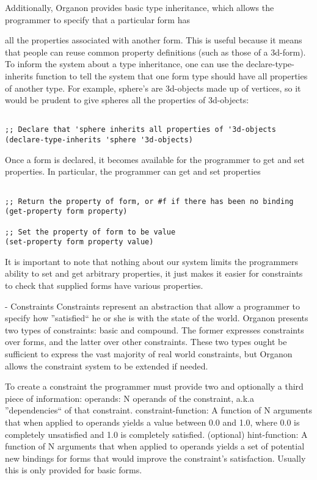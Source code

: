 \documentclass[12pt,a4paper]{article}
\begin{document}
Additionally, Organon provides basic type inheritance, which allows the programmer to specify that a particular form has 

all the properties associated with another form.   This is useful because it means that people can reuse common property definitions (such as those of a 3d-form).  To inform the system about a type inheritance, one can use the declare-type-inherits function to tell the system that one form type should have all properties of another type.  For example, sphere's are 3d-objects made up of vertices, so it would be prudent to give spheres all the properties of 3d-objects:
\begin{lstlisting}

;; Declare that 'sphere inherits all properties of '3d-objects
(declare-type-inherits 'sphere '3d-objects)
\end{lstlisting}

Once a form is declared, it becomes available for the programmer to get and set properties.  In particular, the programmer can get and set properties 
\begin{lstlisting}

;; Return the property of form, or #f if there has been no binding
(get-property form property)

;; Set the property of form to be value 
(set-property form property value)
\end{lstlisting}

It is important to note that nothing about our system limits the programmers ability to set and get arbitrary properties, it just makes it easier for constraints to check that supplied forms have various properties. 

- Constraints
Constraints represent an abstraction that allow a programmer to specify how ''satisfied`` he or she is with the state of the world.  Organon presents two types of constraints: basic and compound.  The former expresses constraints over forms, and the latter over other constraints.  These two types ought be sufficient to express the vast majority of real world constraints, but Organon allows the constraint system to be extended if needed.

To create a constraint the programmer must provide two and optionally a third piece of information:
operands: N operands of the constraint, a.k.a ''dependencies`` of that constraint.
constraint-function: A function of N arguments that when applied to operands yields a value between 0.0 and 1.0, where 0.0 is completely unsatisfied and 1.0 is completely satisfied.
(optional) hint-function:  A function of N arguments that when applied to operands yields a set of potential new bindings for forms that would improve the constraint's satisfaction.  Usually this is only provided for basic forms.
\end{document}

